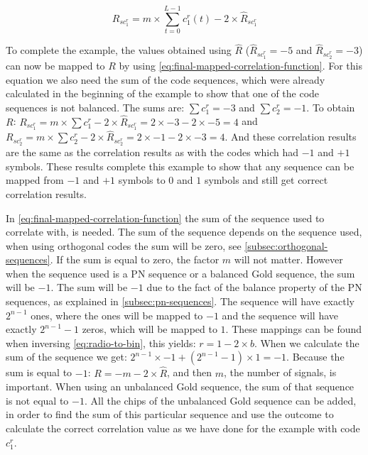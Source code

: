 \begin{equation}
	R_{sc^r_{1}} = m \times \displaystyle\sum_{t = 0} ^ {L - 1} c^r_1(t) - 2 \times \hat{R}_{sc^r_1}
	\label{eq:final-mapped-correlation-function}
\end{equation}


To complete the example, the values obtained using $\hat{R}$ ($\hat{R}_{sc^r_{1}} = -5$ and $\hat{R}_{sc^r_{2}} = -3$) can now be mapped to $R$ by using \autoref{eq:final-mapped-correlation-function}.
For this equation we also need the sum of the code sequences, which were already calculated in the beginning of the example to show that one of the code sequences is not balanced.
The sums are: $\displaystyle\sum c^r_1 = -3$ and $\displaystyle\sum c^r_2 = -1$.
To obtain $R$: $R_{sc^r_{1}} = m \times \displaystyle\sum c^r_1 - 2 \times \hat{R}_{sc^r_1}  = 2 \times -3 - 2 \times -5 = 4$ and $R_{sc^r_{2}} = m \times \displaystyle\sum c^r_2 - 2 \times \hat{R}_{sc^r_2} = 2 \times -1 -2 \times -3 = 4$.
And these correlation results are the same as the correlation results as with the codes which had $-1$ and $+1$ symbols.
These results complete this example to show that any sequence can be mapped from $-1$ and $+1$ symbols to $0$ and $1$ symbols and still get correct correlation results.




In \autoref{eq:final-mapped-correlation-function} the sum of the sequence used to correlate with, is needed. 
The sum of the sequence depends on the sequence used, when using orthogonal codes the sum will be zero, see \autoref{subsec:orthogonal-sequences}.
If the sum is equal to zero, the factor $m$ will not matter.
However when the sequence used is a PN sequence or a balanced Gold sequence, the sum will be $-1$.
The sum will be $-1$ due to the fact of the balance property of the PN sequences, as explained in \autoref{subsec:pn-sequences}.
The sequence will have exactly $2^{n-1}$ ones, where the ones will be mapped to $-1$ and the sequence will have exactly $2^{n-1} -1$ zeros, which will be mapped to $1$.
These mappings can be found when inversing \autoref{eq:radio-to-bin}, this yields: $r = 1 - 2 \times b$.
When we calculate the sum of the sequence we get: $2^{n-1} \times -1 + (2^{n-1} - 1) \times 1 = -1$.
Because the sum is equal to $-1$: $R = -m - 2 \times \hat{R}$, and then $m$, the number of signals, is important.
When using an unbalanced Gold sequence, the sum of that sequence is not equal to $-1$.
All the chips of the unbalanced Gold sequence can be added, in order to find the sum of this particular sequence and use the outcome to calculate the correct correlation value as we have done for the example with code $c^r_1$.









